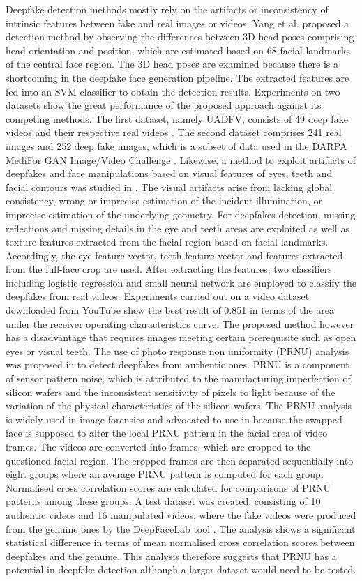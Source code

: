 Deepfake detection methods mostly rely on the artifacts or inconsistency of intrinsic features between fake and real images or videos. Yang et al.  proposed a detection method by observing the differences between 3D head poses comprising head orientation and position, which are estimated based on 68 facial landmarks of the central face region. The 3D head poses are examined because there is a shortcoming in the deepfake face generation pipeline. The extracted features are fed into an SVM classifier to obtain the detection results. Experiments on two datasets show the great performance of the proposed approach against its competing methods. The first dataset, namely UADFV, consists of 49 deep fake videos and their respective real videos . The second dataset comprises 241 real images and 252 deep fake images, which is a subset of data used in the DARPA MediFor GAN Image/Video Challenge . Likewise, a method to exploit artifacts of deepfakes and face manipulations based on visual features of eyes, teeth and facial contours was studied in . The visual artifacts arise from lacking global consistency, wrong or imprecise estimation of the incident illumination, or imprecise estimation of the underlying geometry. For deepfakes detection, missing reflections and missing details in the eye and teeth areas are exploited as well as texture features extracted from the facial region based on facial landmarks. Accordingly, the eye feature vector, teeth feature vector and features extracted from the full-face crop are used. After extracting the features, two classifiers including logistic regression and small neural network are employed to classify the deepfakes from real videos. Experiments carried out on a video dataset downloaded from YouTube show the best result of 0.851 in terms of the area under the receiver operating characteristics curve. The proposed method however has a disadvantage that requires images meeting certain prerequisite such as open eyes or visual teeth.
The use of photo response non uniformity (PRNU) analysis was proposed in  to detect deepfakes from authentic ones. PRNU is a component of sensor pattern noise, which is attributed to the manufacturing imperfection of silicon wafers and the inconsistent sensitivity of pixels to light because of the variation of the physical characteristics of the silicon wafers. The PRNU analysis is widely used in image forensics  and advocated to use in  because the swapped face is supposed to alter the local PRNU pattern in the facial area of video frames. The videos are converted into frames, which are cropped to the questioned facial region. The cropped frames are then separated sequentially into eight groups where an average PRNU pattern is computed for each group. Normalised cross correlation scores are calculated for comparisons of PRNU patterns among these groups. A test dataset was created, consisting of 10 authentic videos and 16 manipulated videos, where the fake videos were produced from the genuine ones by the DeepFaceLab tool . The analysis shows a significant statistical difference in terms of mean normalised cross correlation scores between deepfakes and the genuine. This analysis therefore suggests that PRNU has a potential in deepfake detection although a larger dataset would need to be tested. 
